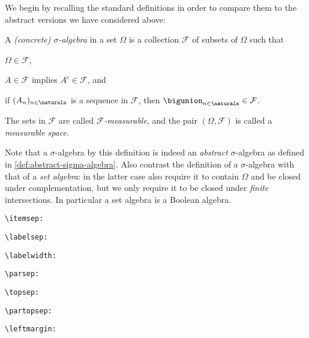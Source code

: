 \documentclass[article, a4paper, 11pt, oneside]{memoir}
\numberwithin{equation}{chapter}
\newcommand{\calF}{\mathcal{F}}
\begin{document}
We begin by recalling the standard definitions in order to compare them to the abstract versions we have considered above:

\begin{definition}
    A \emph{(concrete) $\sigma$-algebra} in a set $\Omega$ is a collection $\calF$ of subsets of $\Omega$ such that
    \begin{enumdef}
        \item $\Omega \in \calF$,
        \item $A \in \calF$ implies $A^c \in \calF$, and
        \item if $(A_n)_{n\in\naturals}$ is a sequence in $\calF$, then $\bigunion_{n\in\naturals} \in \calF$.
    \end{enumdef}
    The sets in $\calF$ are called \emph{$\calF$-measurable}, and the pair $(\Omega, \calF)$ is called a \emph{measurable space}.
\end{definition}
%
Note that a $\sigma$-algebra by this definition is indeed an \emph{abstract} $\sigma$-algebra as defined in \cref{def:abstract-sigma-algebra}. Also contrast the definition of a $\sigma$-algebra with that of a \emph{set algebra}: in the latter case also require it to contain $\Omega$ and be closed under complementation, but we only require it to be closed under \emph{finite} intersections. In particular a set algebra is a Boolean algebra.

\begin{enumdef}
    \item \verb|\itemsep:| \the\itemsep
    \item \verb|\labelsep:| \the{}
    \item \verb|\labelwidth:| \the{}
    \item \verb|\parsep:| \the\parsep
    \item \verb|\topsep:| \the\topsep
    \item \verb|\partopsep:| \the\partopsep
    \item \verb|\leftmargin:| \the\leftmargin
\end{enumdef}
\end{document}
